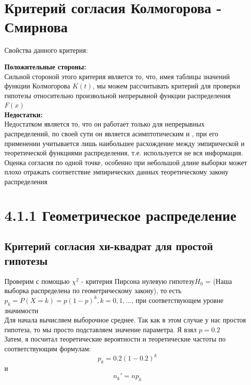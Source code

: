 \documentclass[a4paper,12pt, oneside]{book}
\begin{document}
\section{Критерий согласия Колмогорова - Смирнова}

\begin{center}
	{\Large Свойства данного критерия:}
\end{center}


\textbf{Положительные стороны:}\\

Сильной стороной этого критерия является то, что, имея таблицы значений функции
Колмогорова $ K(t) $, мы можем рассчитывать критерий для проверки гипотезы относительно
произвольной непрерывной функции распределения $F(x)$\\

\textbf{Недостатки:}\\

Недостатком является то, что он работает только для непрерывных распределений, по своей сути он является асимптотическим и , при его применении учитывается лишь наибольшее расхождение между эмпирической и теоретической функциями распределения, т.е. используется не вся информация. Оценка согласия по одной точке, особенно при небольшой длине выборки может плохо отражать соответствие эмпирических данных теоретическому закону распределения

\section{4.1.1 Геометрическое распределение}

\subsection{Критерий согласия хи-квадрат для простой гипотезы}

Проверим с помощью $ \chi^2 $  - критерия Пирсона нулевую гипотезу$ H_0 $ = (Наша выборка распределена по геометрическому закону), то есть $ p_k = P(X = k ) = p (1-p)^k, k = 0,1, \ldots $, при соответствующем уровне значимости\\ 

Для начала вычисляем выборочное среднее. Так как в этом случае у нас простоя гипотеза, то мы просто подставляем значение параметра. Я взял $ p = 0.2 $\\

Затем, я посчитал теоретические вероятности и теоретические частоты по соответствующим  формулам:\\
$$ 
p_k = 0.2 (1 - 0.2)^k 
$$
и
$$
n_k' = n p_k
$$  
\end{document}
